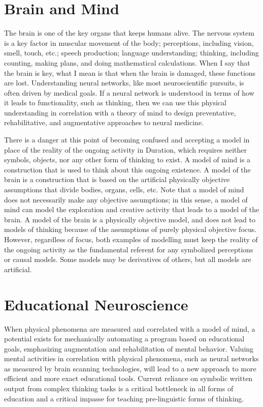 \section{Brain and Mind}

The brain is one of the key organs that keeps humans alive.  The
nervous system is a key factor in muscular movement of the body;
perceptions, including vision, smell, touch, etc.; speech production;
language understanding; thinking, including counting, making plans,
and doing mathematical calculations.  When I say that the brain is
key, what I mean is that when the brain is damaged, these functions
are lost.  Understanding neural networks, like most neuroscientific
pursuits, is often driven by medical goals.  If a neural network is
understood in terms of how it leads to functionality, such as
thinking, then we can use this physical understanding in correlation
with a theory of mind to design preventative, rehabilitative, and
augmentative approaches to neural medicine.

There is a danger at this point of becoming confused and accepting a
model in place of the reality of the ongoing activity in Duration,
which requires neither symbols, objects, nor any other form of
thinking to exist.  A model of mind is a construction that is used to
think about this ongoing existence.  A model of the brain is a
construction that is based on the artificial physically objective
assumptions that divide bodies, organs, cells, etc.  Note that a model
of mind does not necessarily make any objective assumptions; in this
sense, a model of mind can model the exploration and creative activity
that leads to a model of the brain.  A model of the brain is a
physically objective model, and does not lead to models of thinking
because of the assumptions of purely physical objective focus.
However, regardless of focus, both examples of modelling must keep the
reality of the ongoing activity as the fundamental referent for any
symbolized perceptions or causal models.  Some models may be
derivatives of others, but all models are artificial.

\section{Educational Neuroscience}

When physical phenomena are measured and correlated with a model of
mind, a potential exists for mechanically automating a program based
on educational goals, emphasizing augmentation and rehabilitation of
mental behavior.  Valuing mental activities in correlation with
physical phenomena, such as neural networks as measured by brain
scanning technologies, will lead to a new approach to more efficient
and more exact educational tools.  Current reliance on symbolic
written output from complex thinking tasks is a critical bottleneck in
all forms of education and a critical impasse for teaching
pre-linguistic forms of thinking.

